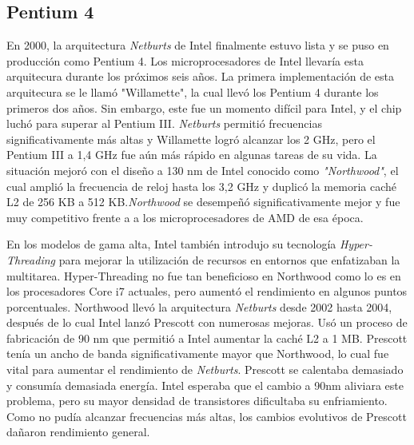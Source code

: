 \subsection{Pentium 4}
En 2000, la arquitectura \emph{Netburts} de Intel finalmente estuvo lista y se puso en producción como Pentium 4. Los microprocesadores de Intel llevaría esta 
arquitecura durante los próximos seis años. La primera implementación de esta arquitecura se le llamó "Willamette", la cual llevó los Pentium 4 
durante los primeros dos años. Sin embargo, este fue un momento difícil para Intel, y el chip luchó para superar al Pentium III. \emph{Netburts} permitió 
frecuencias significativamente más altas y Willamette logró alcanzar los 2 GHz, pero el Pentium III a 1,4 GHz fue aún más rápido en algunas tareas
de su vida. La situación mejoró con el diseño a 130 nm de Intel conocido como \emph{"Northwood"}, el cual  amplió la frecuencia de reloj hasta los 3,2 GHz y 
duplicó la memoria caché L2 de 256 KB a 512 KB.\emph{Northwood} se desempeñó significativamente mejor y fue muy competitivo frente a a los microprocesadores 
de AMD de esa época.

En los modelos de gama alta, Intel también introdujo su tecnología \emph{Hyper-Threading} para mejorar la utilización de recursos en entornos que 
enfatizaban la multitarea. Hyper-Threading no fue tan beneficioso en Northwood como lo es en los procesadores Core i7 actuales, pero aumentó el 
rendimiento en algunos puntos porcentuales.
Northwood llevó la arquitectura \emph{Netburts} desde 2002 hasta 2004, después de lo cual Intel lanzó Prescott con numerosas mejoras. Usó un proceso de 
fabricación de 90 nm que permitió a Intel aumentar la caché L2 a 1 MB.  Prescott tenía un ancho de banda significativamente mayor que Northwood, 
lo cual fue vital para aumentar el rendimiento de \emph{Netburts}. Prescott se calentaba  demasiado y consumía demasiada energía. Intel esperaba que el 
cambio a 90nm aliviara este problema, pero su mayor densidad de transistores dificultaba su enfriamiento. Como no pudía alcanzar frecuencias más altas, 
los cambios evolutivos de Prescott dañaron  rendimiento general.

